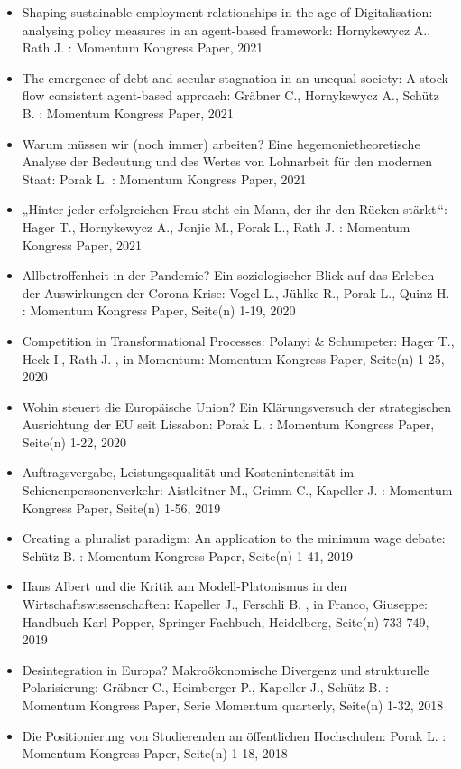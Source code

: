 \begin{itemize}
\item Shaping sustainable employment relationships in the age of Digitalisation: analysing policy measures in an agent-based framework: Hornykewycz A., Rath J. : Momentum Kongress Paper, 2021
\item The emergence of debt and secular stagnation in an unequal society: A stock-flow consistent agent-based approach: Gräbner C., Hornykewycz A., Schütz B. : Momentum Kongress Paper, 2021
\item Warum müssen wir (noch immer) arbeiten? Eine hegemonietheoretische Analyse der Bedeutung und des Wertes von Lohnarbeit für den modernen Staat: Porak L. : Momentum Kongress Paper, 2021
\item „Hinter jeder erfolgreichen Frau steht ein Mann, der ihr den Rücken stärkt.“: Hager T., Hornykewycz A., Jonjic M., Porak L., Rath J. : Momentum Kongress Paper, 2021
\item Allbetroffenheit in der Pandemie? Ein soziologischer Blick auf das Erleben der Auswirkungen der Corona-Krise: Vogel L., Jühlke R., Porak L., Quinz H. : Momentum Kongress Paper, Seite(n) 1-19, 2020
\item Competition in Transformational Processes: Polanyi & Schumpeter: Hager T., Heck I., Rath J. , in Momentum: Momentum Kongress Paper, Seite(n) 1-25, 2020
\item Wohin steuert die Europäische Union? Ein Klärungsversuch der strategischen Ausrichtung der EU seit Lissabon: Porak L. : Momentum Kongress Paper, Seite(n) 1-22, 2020
\item Auftragsvergabe, Leistungsqualität und Kostenintensität im Schienenpersonenverkehr: Aistleitner M., Grimm C., Kapeller J. : Momentum Kongress Paper, Seite(n) 1-56, 2019
\item Creating a pluralist paradigm: An application to the minimum wage debate: Schütz B. : Momentum Kongress Paper, Seite(n) 1-41, 2019
\item Hans Albert und die Kritik am Modell-Platonismus in den Wirtschaftswissenschaften: Kapeller J., Ferschli B. , in Franco, Giuseppe: Handbuch Karl Popper, Springer Fachbuch, Heidelberg, Seite(n) 733-749, 2019
\item Desintegration in Europa? Makroökonomische Divergenz und strukturelle Polarisierung: Gräbner C., Heimberger P., Kapeller J., Schütz B. : Momentum Kongress Paper, Serie Momentum quarterly, Seite(n) 1-32, 2018
\item Die Positionierung von Studierenden an öffentlichen Hochschulen: Porak L. : Momentum Kongress Paper, Seite(n) 1-18, 2018

\end{itemize}
